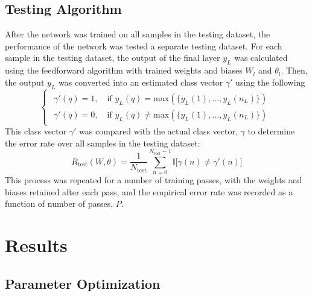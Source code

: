 \documentclass[journal,a4paper,onecolumn,11pt]{IEEEtran}
\begin{document}
\subsection{Testing Algorithm} \label{testing}
After the network was trained on all samples in the testing dataset, the performance of the network was tested a separate testing dataset. For each sample in the testing dataset, the output of the final layer $y_{L}$ was calculated using the feedforward algorithm with trained weights and biases $W_l$ and $\theta_l$. Then, the output $y_L$ was converted into an estimated class vector $\gamma'$ using the following 
\begin{equation}
\begin{cases}
\begin{aligned}
\gamma'(q) = 1,\quad \text{if } y_L(q) = \text{max}(\{ y_L(1),...,y_L(n_L)\}) \\
\gamma'(q) = 0,\quad \text{if } y_L(q) \neq \text{max}(\{ y_L(1),...,y_L(n_L)\})
\end{aligned}
\end{cases}
\end{equation}
This class vector $\gamma'$ was compared with the actual class vector, $\gamma$ to determine the error rate over all samples in the testing dataset:
\begin{equation}
R_{\text{test}}(W,\theta) = \frac{1}{N_\text{test}} \sum_{n=0}^{N_\text{test}-1}\mathbb{I}\bigg[\gamma(n) \neq \gamma'(n) \bigg]
\end{equation}
This process was repeated for a number of training passes, with the weights and biases retained after each pass, and the empirical error rate was recorded as a function of number of passes, $P$.

\section{Results}
\subsection{Parameter Optimization}
\end{document}
